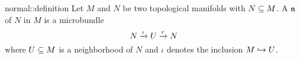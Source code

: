 \begin{mydefinition}{normal::definition}
    Let $M$ and $N$ be two topological manifolds with $N \subseteq{} M$.
    A  $\mathfrak{n}$ of $N$ in $M$ is a microbundle
    \[ N \xrightarrow{\iota} U \xrightarrow{r} N{} \]
    where $U \subseteq{} M$ is a neighborhood of $N$ and $\iota$ denotes the inclusion $M \hookrightarrow{} U$.
\end{mydefinition}